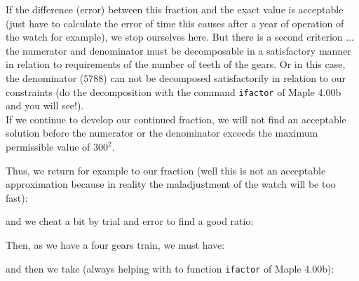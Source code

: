 	\pagebreak
	\begin{tcolorbox}[colframe=black,colback=white,sharp corners]
	If the difference (error) between this fraction and the exact value is acceptable (just have to calculate the error of time this causes after a year of operation of the watch for example), we stop ourselves here. But there is a second criterion ... the numerator and denominator must be decomposable in a satisfactory manner in relation to requirements of the number of teeth of the gears. Or in this case, the denominator ($5788$) can not be decomposed satisfactorily in relation to our constraints (do the decomposition with the command \texttt{ifactor} of Maple 4.00b and you will see!).\\
	
	If we continue to develop our continued fraction, we will not find an acceptable solution before the numerator or the denominator exceeds the maximum permissible value of $300^2$.

	Thus, we return for example to our fraction (well this is not an acceptable approximation because in reality the maladjustment of the watch will be too fast):
	
	and we cheat a bit by trial and error to find a good ratio:
	
	Then, as we have a four gears train, we must have:
	
	and then we take (always helping with to function \texttt{ifactor} of Maple 4.00b):
	
	\end{tcolorbox}
	
